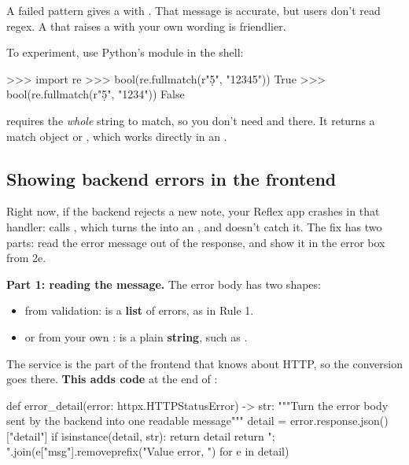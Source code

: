 A failed pattern gives a  with . That message is accurate, but users don't read regex. A  that raises a  with your own wording is friendlier.

To experiment, use Python's  module in the shell:

\begin{py}
>>> import re
>>> bool(re.fullmatch(r"\d{5}", "12345"))
True
>>> bool(re.fullmatch(r"\d{5}", "1234"))
False
\end{py}

 requires the \emph{whole} string to match, so you don't need \cd{^} and \cd{$} there. It returns a match object or , which works directly in an .

\subsection{Showing backend errors in the frontend}

Right now, if the backend rejects a new note, your Reflex app crashes in that handler:  calls , which turns the  into an , and  doesn't catch it. The fix has two parts: read the error message out of the response, and show it in the error box from 2e.

\textbf{Part 1: reading the message.} The error body has two shapes:
\begin{itemize}
\item {} from validation:  is a \textbf{list} of errors, as in Rule 1.
\item {} or  from your own :  is a plain \textbf{string}, such as .
\end{itemize}

The service is the part of the frontend that knows about HTTP, so the conversion goes there. \textbf{This adds code} at the end of :

\begin{py}
def error_detail(error: httpx.HTTPStatusError) -> str:
	"""Turn the error body sent by the backend into one readable message"""
	detail = error.response.json()["detail"]
	if isinstance(detail, str):
		return detail
	return "; ".join(e["msg"].removeprefix("Value error, ") for e in detail)
\end{py}

